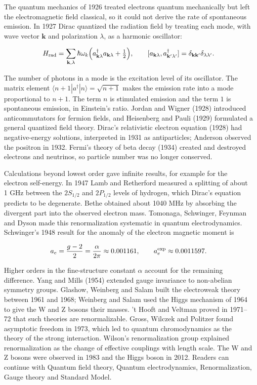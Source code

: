\documentclass[11pt,oneside]{book}
\newenvironment{centeredalign}{\[\begin{gathered}[c]}{\end{gathered}\]}
\begin{document}
The quantum mechanics of 1926 treated electrons quantum mechanically but left the electromagnetic field classical, so it could not derive the rate of spontaneous emission. In 1927 Dirac quantized the radiation field by treating each mode, with wave vector \(\mathbf k\) and polarization \(\lambda\), as a harmonic oscillator:

\begin{centeredalign}
H_{\rm rad}=\sum_{\mathbf k,\lambda}\hbar\omega_k\Bigl(a^\dagger_{\mathbf k\lambda}a_{\mathbf k\lambda}+\tfrac12\Bigr),
\qquad [a_{\mathbf k\lambda},a^\dagger_{\mathbf k'\lambda'}]=\delta_{\mathbf k\mathbf k'}\delta_{\lambda\lambda'} .
\end{centeredalign}

The number of photons in a mode is the excitation level of its oscillator. The matrix element \(\langle n+1|a^\dagger|n\rangle=\sqrt{n+1}\) makes the emission rate into a mode proportional to \(n+1\). The term \(n\) is stimulated emission and the term \(1\) is spontaneous emission, in Einstein's ratio. Jordan and Wigner (1928) introduced anticommutators for fermion fields, and Heisenberg and Pauli (1929) formulated a general quantized field theory. Dirac's relativistic electron equation (1928) had negative-energy solutions, interpreted in 1931 as antiparticles; Anderson observed the positron in 1932. Fermi's theory of beta decay (1934) created and destroyed electrons and neutrinos, so particle number was no longer conserved.

Calculations beyond lowest order gave infinite results, for example for the electron self-energy. In 1947 Lamb and Retherford measured a splitting of about 1 GHz between the \(2S_{1/2}\) and \(2P_{1/2}\) levels of hydrogen, which Dirac's equation predicts to be degenerate. Bethe obtained about 1040 MHz by absorbing the divergent part into the observed electron mass. Tomonaga, Schwinger, Feynman and Dyson made this renormalization systematic in quantum electrodynamics. Schwinger's 1948 result for the anomaly of the electron magnetic moment is

\begin{centeredalign}
a_e=\frac{g-2}{2}=\frac{\alpha}{2\pi}\approx0.001161,\qquad a_e^{\rm exp}\approx0.0011597 .
\end{centeredalign}

Higher orders in the fine-structure constant \(\alpha\) account for the remaining difference. Yang and Mills (1954) extended gauge invariance to non-abelian symmetry groups. Glashow, Weinberg and Salam built the electroweak theory between 1961 and 1968; Weinberg and Salam used the Higgs mechanism of 1964 to give the W and Z bosons their masses. 't Hooft and Veltman proved in 1971--72 that such theories are renormalizable. Gross, Wilczek and Politzer found asymptotic freedom in 1973, which led to quantum chromodynamics as the theory of the strong interaction. Wilson's renormalization group explained renormalization as the change of effective couplings with length scale. The W and Z bosons were observed in 1983 and the Higgs boson in 2012. Readers can continue with Quantum field theory, Quantum electrodynamics, Renormalization, Gauge theory and Standard Model.
\end{document}
